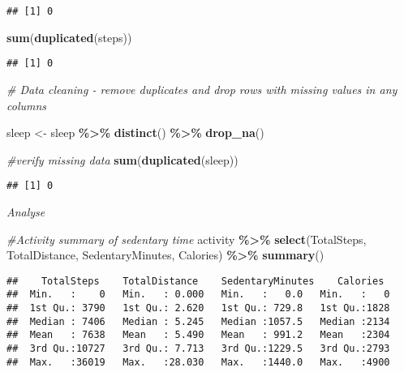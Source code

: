 \documentclass[
]{article}
\newenvironment{Shaded}{\begin{snugshade}}{\end{snugshade}}
\newcommand{\CommentTok}[1]{\textcolor[rgb]{0.56,0.35,0.01}{\textit{#1}}}
\newcommand{\FunctionTok}[1]{\textcolor[rgb]{0.13,0.29,0.53}{\textbf{#1}}}
\newcommand{\NormalTok}[1]{#1}
\newcommand{\OtherTok}[1]{\textcolor[rgb]{0.56,0.35,0.01}{#1}}
\newcommand{\SpecialCharTok}[1]{\textcolor[rgb]{0.81,0.36,0.00}{\textbf{#1}}}
\begin{document}
\begin{verbatim}
## [1] 0
\end{verbatim}

\begin{Shaded}
\begin{Highlighting}[]
\FunctionTok{sum}\NormalTok{(}\FunctionTok{duplicated}\NormalTok{(steps))}
\end{Highlighting}
\end{Shaded}

\begin{verbatim}
## [1] 0
\end{verbatim}

\begin{Shaded}
\begin{Highlighting}[]
\CommentTok{\# Data cleaning {-} remove duplicates and drop rows with missing values in any columns}



\NormalTok{sleep }\OtherTok{\textless{}{-}}\NormalTok{ sleep }\SpecialCharTok{\%\textgreater{}\%}
  \FunctionTok{distinct}\NormalTok{() }\SpecialCharTok{\%\textgreater{}\%}
  \FunctionTok{drop\_na}\NormalTok{()}

\CommentTok{\#verify missing data}
\FunctionTok{sum}\NormalTok{(}\FunctionTok{duplicated}\NormalTok{(sleep))}
\end{Highlighting}
\end{Shaded}

\begin{verbatim}
## [1] 0
\end{verbatim}

\emph{Analyse}

\begin{Shaded}
\begin{Highlighting}[]
\CommentTok{\#Activity summary of sedentary time}
\NormalTok{activity }\SpecialCharTok{\%\textgreater{}\%}  
  \FunctionTok{select}\NormalTok{(TotalSteps,}
\NormalTok{         TotalDistance,}
\NormalTok{         SedentaryMinutes, Calories) }\SpecialCharTok{\%\textgreater{}\%}
  \FunctionTok{summary}\NormalTok{()}
\end{Highlighting}
\end{Shaded}

\begin{verbatim}
##    TotalSteps    TotalDistance    SedentaryMinutes    Calories   
##  Min.   :    0   Min.   : 0.000   Min.   :   0.0   Min.   :   0  
##  1st Qu.: 3790   1st Qu.: 2.620   1st Qu.: 729.8   1st Qu.:1828  
##  Median : 7406   Median : 5.245   Median :1057.5   Median :2134  
##  Mean   : 7638   Mean   : 5.490   Mean   : 991.2   Mean   :2304  
##  3rd Qu.:10727   3rd Qu.: 7.713   3rd Qu.:1229.5   3rd Qu.:2793  
##  Max.   :36019   Max.   :28.030   Max.   :1440.0   Max.   :4900
\end{verbatim}
\end{document}
